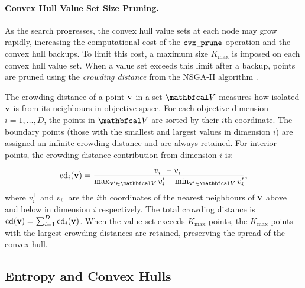 \paragraph{Convex Hull Value Set Size Pruning.}

    As the search progresses, the convex hull value sets at each node may grow rapidly, increasing the computational cost of the ${\textnormal{\texttt{cvx\_prune}}}$ operation and the convex hull backups. To limit this cost, a maximum size $K_{\max}$ is imposed on each convex hull value set. When a value set exceeds this limit after a backup, points are pruned using the \textit{crowding distance} from the NSGA-II algorithm \cite{nsga_ii}.

    The crowding distance of a point $\mathbf{v}$ in a set $\bfcl{V}$ measures how isolated $\mathbf{v}$ is from its neighbours in objective space. For each objective dimension $i=1,\ldots,D$, the points in $\bfcl{V}$ are sorted by their $i$th coordinate. The boundary points (those with the smallest and largest values in dimension $i$) are assigned an infinite crowding distance and are always retained. For interior points, the crowding distance contribution from dimension $i$ is:
    \begin{align}
        \textnormal{cd}_i(\bff{v}) = 
            \frac{v^+_i - v^-_i}{\max_{\bff{v}'\in\bfcl{V}} 
            v'_i - \min_{\bff{v}'\in\bfcl{V}} v'_i},
            \label{eq:5:crowding_distance}
    \end{align}
    where $v^+_i$ and $v^-_i$ are the $i$th coordinates of the nearest neighbours of $\mathbf{v}$ above and below in dimension $i$ respectively. The total crowding distance is $\textnormal{cd}(\mathbf{v}) = \sum_{i=1}^D \textnormal{cd}_i(\mathbf{v})$. When the value set exceeds $K_{\max}$ points, the $K_{\max}$ points with the largest crowding distances are retained, preserving the spread of the convex hull.


\subsection{Entropy and Convex Hulls}
\label{sec:5-3-7-entropy-convex-hulls}

